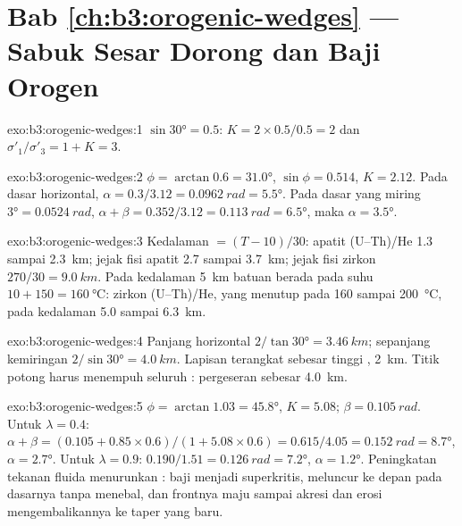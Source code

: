 \section*{Bab \ref{ch:b3:orogenic-wedges} --- Sabuk Sesar Dorong dan Baji Orogen}

\begin{solution}{exo:b3:orogenic-wedges:1}
$\sin\ang{30} = 0.5$: $K = 2\times0.5/0.5 = 2$ dan $\sigma'_1/\sigma'_3 = 1 +
K = 3$.
\end{solution}

\begin{solution}{exo:b3:orogenic-wedges:2}
$\phi = \arctan0.6 = \ang{31.0}$, $\sin\phi = 0.514$, $K = 2.12$. Pada
dasar horizontal, $\alpha = 0.3/3.12 = \qty{0.0962}{rad} = \ang{5.5}$. Pada
dasar yang miring $\ang{3} = \qty{0.0524}{rad}$, $\alpha + \beta = 0.352/3.12 =
\qty{0.113}{rad} = \ang{6.5}$, maka $\alpha = \ang{3.5}$.
\end{solution}

\begin{solution}{exo:b3:orogenic-wedges:3}
Kedalaman $= (T - 10)/30$: apatit (U--Th)/He 1.3 sampai \qty{2.3}{km}; jejak fisi apatit
2.7 sampai \qty{3.7}{km}; jejak fisi zirkon $270/30 = \qty{9.0}{km}$. Pada
kedalaman \qty{5}{km} batuan berada pada suhu $10 + 150 = \qty{160}{\celsius}$: zirkon
(U--Th)/He, yang menutup pada 160 sampai \qty{200}{\celsius}, pada kedalaman 5.0 sampai
\qty{6.3}{km}.
\end{solution}

\begin{solution}{exo:b3:orogenic-wedges:4}
Panjang horizontal $2/\tan\ang{30} = \qty{3.46}{km}$; sepanjang kemiringan
$2/\sin\ang{30} = \qty{4.0}{km}$. Lapisan terangkat sebesar tinggi ,
\qty{2}{km}. Titik potong harus menempuh seluruh : pergeseran sebesar
\qty{4.0}{km}.
\end{solution}

\begin{solution}{exo:b3:orogenic-wedges:5}
$\phi = \arctan1.03 = \ang{45.8}$, $K = 5.08$; $\beta = \qty{0.105}{rad}$.
Untuk $\lambda = 0.4$: $\alpha + \beta = (0.105 + 0.85\times0.6)/(1 +
5.08\times0.6) = 0.615/4.05 = \qty{0.152}{rad} = \ang{8.7}$, $\alpha =
\ang{2.7}$. Untuk $\lambda = 0.9$: $0.190/1.51 = \qty{0.126}{rad} = \ang{7.2}$,
$\alpha = \ang{1.2}$. Peningkatan tekanan fluida menurunkan :
baji menjadi superkritis, meluncur ke depan pada dasarnya tanpa
menebal, dan frontnya maju sampai akresi dan erosi mengembalikannya
ke taper yang baru.
\end{solution}

